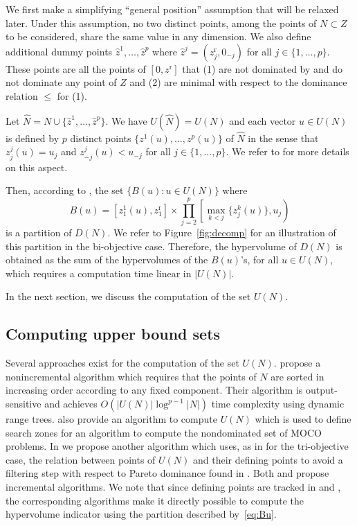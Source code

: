\documentclass[a4paper,11pt]{article}
\newcommand{\hN}{\hat{N}}
\newcommand{\hz}{\hat{z}}
\newcommand{\BM}{z^{\text{r}}}
\newcommand{\Bm}{0}
\newcommand{\Bzero}{0}
\begin{document}
We first make a simplifying ``general position'' assumption that will be relaxed later.
Under this assumption, no two distinct points,
among the points of $N\subset Z$ to be considered,
share the same value in any dimension.
We also define additional dummy points $\hz^1, \dots, \hz^p$
where $\hz^j = (\BM_j,\Bm_{-j})$ for all $j\in \{1, \dots, p\}$.
These points are all the points of $[\Bzero, \BM]$
that (1) are not dominated by and do not dominate any point of $Z$
 and (2) are minimal with respect to the dominance relation $\leq$ for (1).

Let $\hN = N \cup \{\hz^1, \dots, \hz^p\}$.
We have $U(\hN) = U(N)$ and each vector $u \in U(N)$
is defined by $p$ distinct points $\{z^1(u), \dots, z^p(u)\}$ of $\hN$
in the sense that $z^j_j(u) = u_j$ and $z^j_{-j}(u) < u_{-j}$
for all $j\in \{1, \dots, p\}$.
We refer to \citet{KlaLacVan15} for more details on this aspect.



Then, according to 
\citet{KapRubShaVer08}, the set $\{B(u):u\in U(N)\}$ where
\begin{equation}
B(u) = [z^1_1(u), \BM_1] \times \prod_{j=2}^p \left[\max_{k<j} \{z_j^k(u)\}, u_j\right)\label{eq:Bu}
\end{equation}
is a partition of $D(N)$.
We refer to Figure~\ref{fig:decomp} for an illustration of this partition in the bi-objective case.
Therefore, the hypervolume of $D(N)$ is obtained as the sum of the hypervolumes of the $B(u)$'s,
for all $u\in U(N)$, which requires a computation time linear in $|U(N)|$.


In the next section, we discuss the computation of the set $U(N)$.

\subsection{Computing upper bound sets}\label{sub:ubs}

Several approaches exist for the computation of the set $U(N)$. 
\citet{KapRubShaVer08} propose a nonincremental algorithm
which requires that the points of $N$ are sorted 
in increasing order according to any fixed component.
Their algorithm is output-sensitive
and achieves $O(|U(N)| \log^{p-1} |N|)$ time complexity 
using dynamic range trees.
\citet{PrzGanEhr10} also provide an algorithm to compute $U(N)$
which is used to define search zones for an algorithm to compute the nondominated
set of MOCO problems.
In \citet{KlaLacVan15} we propose another algorithm which uses, 
as in \citet{DaeKla14} for the tri-objective case,
the relation between points of $U(N)$ and their defining points to avoid a filtering step with respect to Pareto dominance
found in \citet{PrzGanEhr10}.
Both \citet{PrzGanEhr10} and \citet{KlaLacVan15} propose incremental algorithms.
We note that since defining points are tracked in \citet{KapRubShaVer08} and \citet{KlaLacVan15}, the corresponding algorithms
make it directly possible to compute the hypervolume indicator using the partition described by~\eqref{eq:Bu}.
\end{document}
